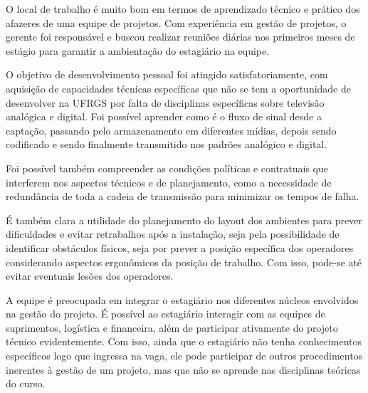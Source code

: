 \documentclass[
	12pt,				%
	oneside,			%
	a4paper,			%
	brazil
	]{abntex2}
\begin{document}
O local de trabalho é muito bom em termos de aprendizado técnico e prático dos afazeres de uma equipe de projetos. Com experiência em gestão de projetos, o gerente foi responsável e buscou realizar reuniões diárias nos primeiros meses de estágio para garantir a ambientação do estagiário na equipe.

O objetivo de desenvolvimento pessoal foi atingido satisfatoriamente, com aquisição de capacidades técnicas específicas que não se tem a oportunidade de desenvolver na UFRGS por falta de disciplinas específicas sobre televisão analógica e digital. Foi possível aprender como é o fluxo de sinal desde a captação, passando pelo armazenamento em diferentes mídias, depois sendo codificado e sendo finalmente transmitido nos padrões analógico e digital.

Foi possível também compreender as condições políticas e contratuais que interferem nos aspectos técnicos e de planejamento, como a necessidade de redundância de toda a cadeia de transmissão para minimizar os tempos de falha.

É também clara a utilidade do planejamento do layout dos ambientes para prever dificuldades e evitar retrabalhos após a instalação, seja pela possibilidade de identificar obstáculos físicos, seja por prever a posição específica dos operadores considerando aspectos ergonômicos da posição de trabalho. Com isso, pode-se até evitar eventuais lesões dos operadores.

A equipe é preocupada em integrar o estagiário nos diferentes núcleos envolvidos na gestão do projeto. É possível ao estagiário interagir com as equipes de suprimentos, logística e financeira, além de participar ativamente do projeto técnico evidentemente. Com isso, ainda que o estagiário não tenha conhecimentos específicos logo que ingressa na vaga, ele pode participar de outros procedimentos inerentes à gestão de um projeto, mas que não se aprende nas disciplinas teóricas do curso.

\postextual


\end{document}
